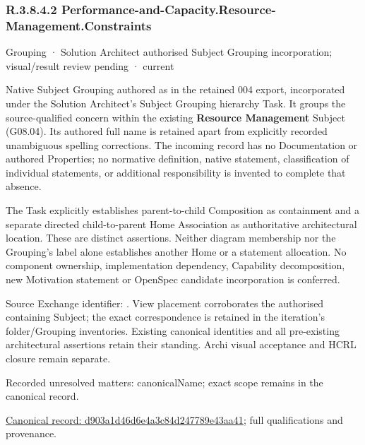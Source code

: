 \subsubsection*{R.3.8.4.2 Performance-and-Capacity.Resource-Management.Constraints}
\label{navigation:R.3.8.4.2}

\label{element:d903a1d46d6e4a3c84d247789e43aa41}
{\small Grouping · Solution Architect authorised Subject Grouping incorporation; visual/result review pending · current}\par

Native Subject Grouping authored as \texttt{} in the retained 004 export,
incorporated under the Solution Architect's Subject Grouping hierarchy Task.
It groups the source-qualified \texttt{} concern within
the existing \textbf{Resource Management} Subject (G08.04). Its authored full name
is retained apart from explicitly recorded unambiguous spelling corrections.
The incoming record has no Documentation or authored Properties; no normative
definition, native statement, classification of individual statements, or
additional responsibility is invented to complete that absence.



The Task explicitly establishes parent-to-child Composition as containment and
a separate directed child-to-parent Home Association as authoritative architectural
location. These are distinct assertions. Neither diagram membership nor the
Grouping's label alone establishes another Home or a statement allocation.
No component ownership, implementation dependency, Capability decomposition,
new Motivation statement or OpenSpec candidate incorporation is conferred.



Source Exchange identifier: \texttt{}. View placement corroborates
the authorised containing Subject; the exact correspondence is retained in the
iteration's folder/Grouping inventories. Existing canonical identities and all
pre-existing architectural assertions retain their standing. Archi visual
acceptance and HCRL closure remain separate.


{\small Recorded unresolved matters: canonicalName; exact scope remains in the canonical record.}\par
{\footnotesize \href{../../../../continuum/grouping/d903a1d46d6e4a3c84d247789e43aa41.md}{Canonical record: d903a1d46d6e4a3c84d247789e43aa41}; full qualifications and provenance.}\par
